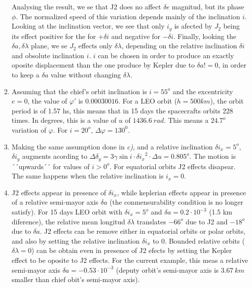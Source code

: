 \documentclass[a4paper]{report}
\begin{document}
\begin{enumerate}[label=\emph{\alph*)}]
    Analysing the result, we se that J2 does no affect $\delta e$ magnitud, but its phase $\phi$. The normalized speed of this variation depends mainly of the inclination $i$. Looking at the inclination vector, we see that only $i_y$ is afected by $J_2$ being its effect positive for the for $+\delta i$ and negative for $-\delta i$. Finally, looking the $\delta a, \delta \lambda$ plane, we se $J_2$ effects only $\delta\lambda$, depending on the relative inclination $\delta i$ and obsolute inclination $i$. $i$ can be chosen in order to produce an exactly oposite displacement than the one produce by Kepler due to $\delta a != 0$, in order to keep a $\delta a$ value without changing $\delta \lambda$.
  
  \item %
    Assuming that the chief's orbit inclination is $i = 55^o$ and the excentricity $e = 0$, the value of $\varphi'$ is $0.00030016$. For a LEO orbit ($h = 500 km$), the orbit period is of 1.57 hs, this means that in 15 days the spacecrafts orbits 228 times. In degrees, this is a value of $u$ of $1436.6~rad$. This means a $24.7^o$ variation of $\varphi$. For $i = 20^o $, $\Delta\varphi = 130^0$.

  \item %
    Making the same assumption done in \textit{c)}, and a relative inclination $\delta i_x=5^o$, $\delta i_y$ augments acording to $\Delta \delta_y = 3\gamma\sin{i\cdot\delta i_x}^2\cdot\Delta u = 0.805^o $. The motion is ´´upwards´´ for values of $i > 0^o$. For equatorial orbits J2 effects disapear. The same happens when the relative inclination is $i_x = 0$.
   
  \item %
    J2 effects appear in presence of $\delta i_x$, while keplerian effects appear in presence of a relative semi-mayor axis $\delta a$ (the conmensurability condition is no longer satisfy). For 15 days LEO orbit with $\delta i_x = 5^o$ and $\delta a = 0.2\cdot10^{-3}$ (1.5 km diference), the relative mean longitud $\delta\lambda$ translates $-66^o$ due to J2 and $-18^o$ due to $\delta a$. J2 effects can be remove either in equatorial orbits or polar orbits, and also by setting the relative inclination $\delta i_x$ to $0$. Bounded relative orbits ($\delta \lambda = 0$) can be obtain even in presence of J2 efects by setting the Kepler effect to be oposite to J2 effects. For the current example, this meas a relative semi-mayor axis $\delta a = -0.53\cdot10^{-3}$ (deputy orbit's semi-mayor axis is $3.67~km$ smaller than chief obit's semi-mayor axis). 


\end{enumerate}
\end{document}
